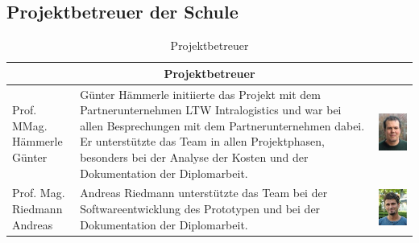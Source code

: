 \subsection{Projektbetreuer der Schule}
\begin{table}[H]
  \centering
  \begin{tabular}{lp{}c}
    \multicolumn{3}{c}{\textbf{Projektbetreuer}} \\
    \toprule
    \makecell[l]{Prof. MMag.                     \\Hämmerle Günter} & Günter Hämmerle initiierte das Projekt mit dem Partnerunternehmen LTW Intralogistics und war bei allen Besprechungen mit dem Partnerunternehmen dabei. Er unterstützte das Team in allen Projektphasen, besonders bei der Analyse der Kosten und der Dokumentation der Diplomarbeit. & \begin{minipage}{.3\textwidth} \includegraphics{images/günterhämmerle.jpg} \end{minipage} \\
    \midrule
    \makecell[l]{Prof. Mag.                      \\Riedmann Andreas} & Andreas Riedmann unterstützte das Team bei der Softwareentwicklung des Prototypen und bei der Dokumentation der Diplomarbeit. & \begin{minipage}{.3\textwidth}\includegraphics{images/andreasriedmann.jpg} \end{minipage} \\
    \bottomrule
  \end{tabular}
  \caption{Projektbetreuer}
  \label{tab:projektbetreuer}
\end{table}

